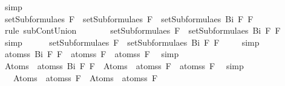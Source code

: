 \begin{isabellebody}
\ simp\isanewline
\ \ \ \ \isamarkupfalse%
\ \isamarkupfalse%
\ {}{\isacharcolon}{\isachardoublequoteopen}setSubformulae{\isacharunderscore}s\ F{}\ {\isasymunion}\ setSubformulae{\isacharunderscore}s\ F{}\ {\isasymsubseteq}\ setSubformulae{\isacharunderscore}s\ {\isacharparenleft}Bi\ F{}\ F{}{\isacharparenright}{\isachardoublequoteclose}\ \isamarkupfalse%
\ {\isacharparenleft}rule\ subContUnion{}{\isacharparenright}\isanewline
\ \ \ \ \isamarkupfalse%
\ \isamarkupfalse%
\ {\isachardoublequoteopen}setSubformulae{\isacharunderscore}s\ F{}\ {\isasymsubseteq}\ setSubformulae{\isacharunderscore}s\ {\isacharparenleft}Bi\ F{}\ F{}{\isacharparenright}{\isachardoublequoteclose}\ \isamarkupfalse%
\ simp\isanewline
\ \ \ \ \isamarkupfalse%
\ {\isachardoublequoteopen}setSubformulae{\isacharunderscore}s\ F{}\ {\isasymsubseteq}\ setSubformulae{\isacharunderscore}s\ {\isacharparenleft}Bi\ F{}\ F{}{\isacharparenright}{\isachardoublequoteclose}\ \isamarkupfalse%
\ {}\ \isamarkupfalse%
\ simp\isanewline
\ \ \ \ \isamarkupfalse%
\ \isamarkupfalse%
\ {\isachardoublequoteopen}atoms{\isacharunderscore}s\ {\isacharparenleft}Bi\ F{}\ F{}{\isacharparenright}\ {\isacharequal}\ atoms{\isacharunderscore}s\ F{}\ {\isasymunion}\ atoms{\isacharunderscore}s\ F{}{\isachardoublequoteclose}\ \isamarkupfalse%
\ simp\isanewline
\ \ \ \ \isamarkupfalse%
\ \isamarkupfalse%
\ {\isachardoublequoteopen}Atom{\isacharunderscore}s\ {\isacharbackquote}\ atoms{\isacharunderscore}s\ {\isacharparenleft}Bi\ F{}\ F{}{\isacharparenright}\ {\isacharequal}\ Atom{\isacharunderscore}s\ {\isacharbackquote}\ {\isacharparenleft}atoms{\isacharunderscore}s\ F{}\ {\isasymunion}\ atoms{\isacharunderscore}s\ F{}{\isacharparenright}{\isachardoublequoteclose}\ \isamarkupfalse%
\ simp\isanewline
\ \ \ \ \isamarkupfalse%
\ \isamarkupfalse%
\ {\isachardoublequoteopen}{\isachardot}{\isachardot}{\isachardot}\ {\isacharequal}\ Atom{\isacharunderscore}s\ {\isacharbackquote}\ atoms{\isacharunderscore}s\ F{}\ {\isasymunion}\ Atom{\isacharunderscore}s\ {\isacharbackquote}\ atoms{\isacharunderscore}s\ F{}{\isachardoublequoteclose}\ \isamarkupfalse%

\end{isabellebody}
